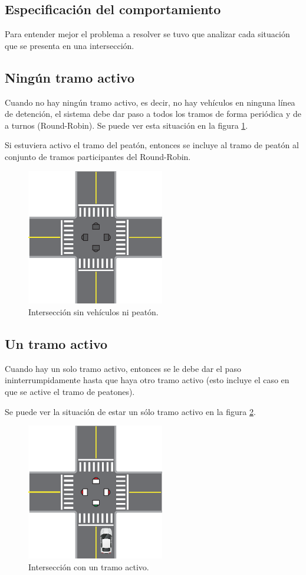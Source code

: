 \subsection{Especificación del comportamiento}\label{sec:spec}
Para entender mejor el problema a resolver se tuvo que analizar cada situación que se presenta en una intersección.
\subsection{Ningún tramo activo}
Cuando no hay ningún tramo activo, es decir, no hay vehículos en ninguna línea de detención, el sistema debe dar paso a todos los tramos de forma periódica y de a turnos (Round-Robin). Se puede ver esta situación en la figura \ref{fig:ningun-activo}.

Si estuviera activo el tramo del peatón, entonces se incluye al tramo de peatón al conjunto de tramos participantes del Round-Robin.

\begin{figure}[htbp]
	\centering
	\includegraphics[width=6cm]{imagenes/ningun-activo.eps}
	\caption{Intersección sin vehículos ni peatón.}
	\label{fig:ningun-activo}
\end{figure}

\subsection{Un tramo activo}
Cuando hay un solo tramo activo, entonces se le debe dar el paso ininterrumpidamente hasta que haya otro tramo activo (esto incluye el caso en que se active el tramo de peatones).

Se puede ver la situación de estar un sólo tramo activo en la figura \ref{fig:un-activo}.

\begin{figure}[htbp]
	\centering
	\includegraphics[width=6cm]{imagenes/un-activo.eps}
	\caption{Intersección con un tramo activo.}
	\label{fig:un-activo}
\end{figure}


